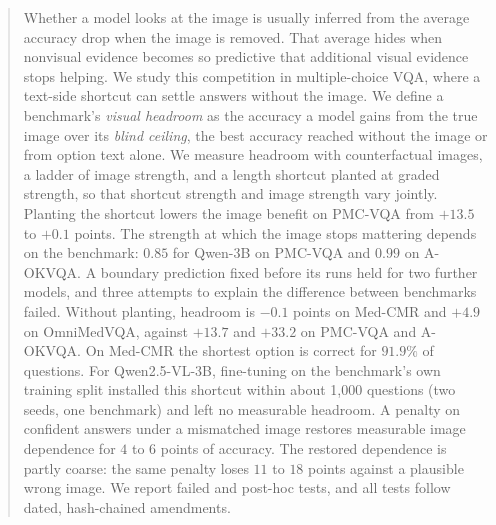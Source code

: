 \begin{abstract}
Whether a model looks at the image is usually inferred from the average accuracy drop when the image is removed. That average hides when nonvisual evidence becomes so predictive that additional visual evidence stops helping. We study this competition in multiple-choice VQA, where a text-side shortcut can settle answers without the image. We define a benchmark's \emph{visual headroom} as the accuracy a model gains from the true image over its \emph{blind ceiling}, the best accuracy reached without the image or from option text alone. We measure headroom with counterfactual images, a ladder of image strength, and a length shortcut planted at graded strength, so that shortcut strength and image strength vary jointly. Planting the shortcut lowers the image benefit on PMC-VQA from $+13.5$ to $+0.1$ points. The strength at which the image stops mattering depends on the benchmark: $0.85$ for Qwen-3B on PMC-VQA and $0.99$ on A-OKVQA. A boundary prediction fixed before its runs held for two further models, and three attempts to explain the difference between benchmarks failed. Without planting, headroom is $-0.1$ points on Med-CMR and $+4.9$ on OmniMedVQA, against $+13.7$ and $+33.2$ on PMC-VQA and A-OKVQA. On Med-CMR the shortest option is correct for $91.9\%$ of questions. For Qwen2.5-VL-3B, fine-tuning on the benchmark's own training split installed this shortcut within about 1{,}000 questions (two seeds, one benchmark) and left no measurable headroom. A penalty on confident answers under a mismatched image restores measurable image dependence for $4$ to $6$ points of accuracy. The restored dependence is partly coarse: the same penalty loses $11$ to $18$ points against a plausible wrong image. We report failed and post-hoc tests, and all tests follow dated, hash-chained amendments.
\end{abstract}
